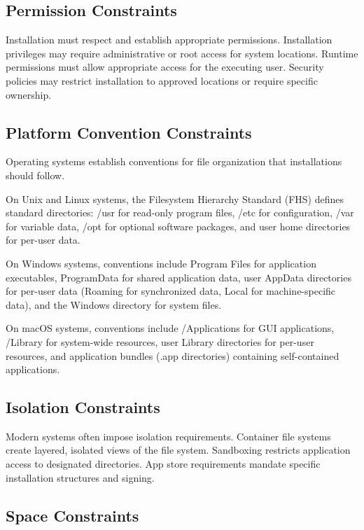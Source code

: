 \documentclass[11pt]{article}
\begin{document}
\subsection{Permission Constraints}

Installation must respect and establish appropriate permissions. Installation privileges may require administrative or root access for system locations. Runtime permissions must allow appropriate access for the executing user. Security policies may restrict installation to approved locations or require specific ownership.

\subsection{Platform Convention Constraints}

Operating systems establish conventions for file organization that installations should follow.

On Unix and Linux systems, the Filesystem Hierarchy Standard (FHS) defines standard directories: /usr for read-only program files, /etc for configuration, /var for variable data, /opt for optional software packages, and user home directories for per-user data.

On Windows systems, conventions include Program Files for application executables, ProgramData for shared application data, user AppData directories for per-user data (Roaming for synchronized data, Local for machine-specific data), and the Windows directory for system files.

On macOS systems, conventions include /Applications for GUI applications, /Library for system-wide resources, user Library directories for per-user resources, and application bundles (.app directories) containing self-contained applications.

\subsection{Isolation Constraints}

Modern systems often impose isolation requirements. Container file systems create layered, isolated views of the file system. Sandboxing restricts application access to designated directories. App store requirements mandate specific installation structures and signing.

\subsection{Space Constraints}
\end{document}
